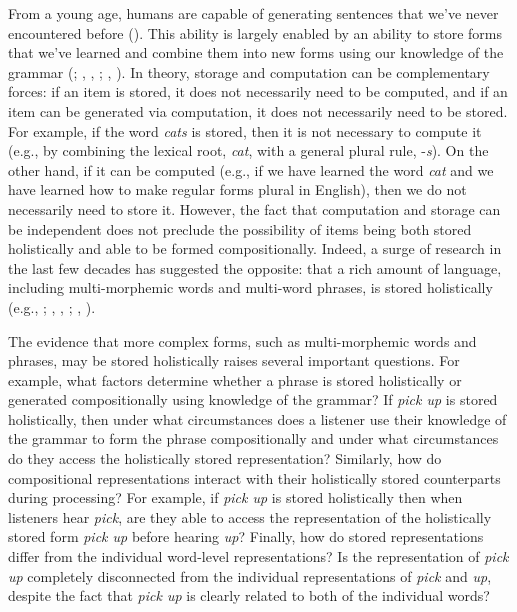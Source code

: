 \documentclass[
  12pt,
  letterpaper,
]{scrreport}
\begin{document}
From a young age, humans are capable of generating sentences that we've
never encountered before
(). This
ability is largely enabled by an ability to store forms that we've
learned and combine them into new forms using our knowledge of the
grammar (;
,
,
;
,
). In theory,
storage and computation can be complementary forces: if an item is
stored, it does not necessarily need to be computed, and if an item can
be generated via computation, it does not necessarily need to be stored.
For example, if the word \emph{cats} is stored, then it is not necessary
to compute it (e.g., by combining the lexical root, \emph{cat}, with a
general plural rule, -\emph{s}). On the other hand, if it can be
computed (e.g., if we have learned the word \emph{cat} and we have
learned how to make regular forms plural in English), then we do not
necessarily need to store it. However, the fact that computation and
storage can be independent does not preclude the possibility of items
being both stored holistically and able to be formed compositionally.
Indeed, a surge of research in the last few decades has suggested the
opposite: that a rich amount of language, including multi-morphemic
words and multi-word phrases, is stored holistically (e.g.,
; , ,
;
,
).

The evidence that more complex forms, such as multi-morphemic words and
phrases, may be stored holistically raises several important questions.
For example, what factors determine whether a phrase is stored
holistically or generated compositionally using knowledge of the
grammar? If \emph{pick up} is stored holistically, then under what
circumstances does a listener use their knowledge of the grammar to form
the phrase compositionally and under what circumstances do they access
the holistically stored representation? Similarly, how do compositional
representations interact with their holistically stored counterparts
during processing? For example, if \emph{pick up} is stored holistically
then when listeners hear \emph{pick}, are they able to access the
representation of the holistically stored form \emph{pick up} before
hearing \emph{up}? Finally, how do stored representations differ from
the individual word-level representations? Is the representation of
\emph{pick up} completely disconnected from the individual
representations of \emph{pick} and \emph{up}, despite the fact that
\emph{pick up} is clearly related to both of the individual words?
\end{document}
